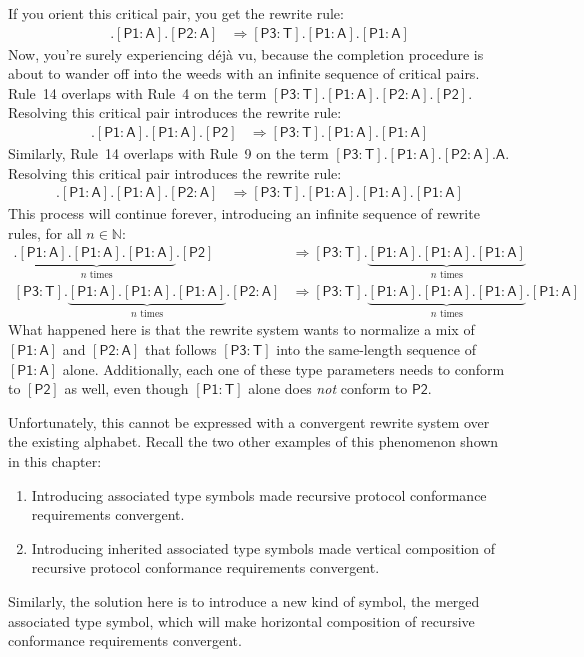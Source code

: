 \documentclass[headsepline,bibliography=totoc]{scrreport}
\newcommand{\namesym}[1]{\mathsf{#1}}
\newcommand{\proto}[1]{\bm{\mathsf{#1}}}
\newcommand{\protosym}[1]{[\proto{#1}]}
\newcommand{\assocsym}[2]{[\proto{#1}\colon\namesym{#2}]}
\theoremstyle{definition}
\theoremstyle{definition}
\theoremstyle{definition}
\begin{document}
If you orient this critical pair, you get the rewrite rule:
\begin{align}
\assocsym{P3}{T}.\assocsym{P1}{A}.\assocsym{P2}{A}&\Rightarrow \assocsym{P3}{T}.\assocsym{P1}{A}.\assocsym{P1}{A}\tag{14}
\end{align}
Now, you're surely experiencing d\'ej\`a vu, because the completion procedure is about to wander off into the weeds with an infinite sequence of critical pairs. Rule~14 overlaps with Rule~4 on the term $\assocsym{P3}{T}.\assocsym{P1}{A}.\assocsym{P2}{A}.\protosym{P2}$. Resolving this critical pair introduces the rewrite rule:
\begin{align}
\assocsym{P3}{T}.\assocsym{P1}{A}.\assocsym{P1}{A}.\protosym{P2}&\Rightarrow \assocsym{P3}{T}.\assocsym{P1}{A}.\assocsym{P1}{A}\tag{15}
\end{align}
Similarly, Rule~14 overlaps with Rule~9 on the term $\assocsym{P3}{T}.\assocsym{P1}{A}.\assocsym{P2}{A}.\namesym{A}$. Resolving this critical pair introduces the rewrite rule:
\begin{align}
\assocsym{P3}{T}.\assocsym{P1}{A}.\assocsym{P1}{A}.\assocsym{P2}{A}&\Rightarrow \assocsym{P3}{T}.\assocsym{P1}{A}.\assocsym{P1}{A}.\assocsym{P1}{A}\tag{16}
\end{align}
This process will continue forever, introducing an infinite sequence of rewrite rules, for all $n\in\mathbb{N}$:
\begin{align*}
\assocsym{P3}{T}.\underbrace{\assocsym{P1}{A}.\assocsym{P1}{A}.\assocsym{P1}{A}}_{\text{$n$ times}}.\protosym{P2}&\Rightarrow \assocsym{P3}{T}.\underbrace{\assocsym{P1}{A}.\assocsym{P1}{A}.\assocsym{P1}{A}}_{\text{$n$ times}}\\
\assocsym{P3}{T}.\underbrace{\assocsym{P1}{A}.\assocsym{P1}{A}.\assocsym{P1}{A}}_{\text{$n$ times}}.\assocsym{P2}{A}&\Rightarrow \assocsym{P3}{T}.\underbrace{\assocsym{P1}{A}.\assocsym{P1}{A}.\assocsym{P1}{A}}_{\text{$n$ times}}.\assocsym{P1}{A}
\end{align*}
What happened here is that the rewrite system wants to normalize a mix of $\assocsym{P1}{A}$ and $\assocsym{P2}{A}$ that follows $\assocsym{P3}{T}$ into the same-length sequence of $\assocsym{P1}{A}$ alone. Additionally, each one of these type parameters needs to conform to $\protosym{P2}$ as well, even though $\assocsym{P1}{T}$ alone does \emph{not} conform to $\proto{P2}$.

Unfortunately, this cannot be expressed with a convergent rewrite system over the existing alphabet. Recall the two other examples of this phenomenon shown in this chapter:
\begin{enumerate}
\item Introducing associated type symbols made recursive protocol conformance requirements convergent.
\item Introducing inherited associated type symbols made vertical composition of recursive protocol conformance requirements convergent.
\end{enumerate}
Similarly, the solution here is to introduce a new kind of symbol, the merged associated type symbol, which will make horizontal composition of recursive conformance requirements convergent.
\end{document}
